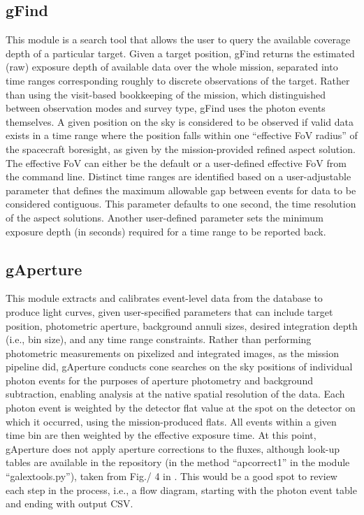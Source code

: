 \documentclass[5p]{elsarticle}
\begin{document}
\subsection{gFind}
This module is a search tool that allows the user to query the available coverage depth of a particular target. Given a target position, gFind returns the estimated (raw) exposure depth of available data over the whole mission, separated into time ranges corresponding roughly to discrete observations of the target. Rather than using the visit-based bookkeeping of the mission, which distinguished between observation modes and survey type, gFind uses the photon events themselves. A given position on the sky is considered to be observed if valid data exists in a time range where the position falls within one ``effective FoV radius'' of the spacecraft boresight, as given by the mission-provided refined aspect solution.  The effective FoV can either be the default or a user-defined effective FoV from the command line.  Distinct time ranges are identified based on a user-adjustable parameter that defines the maximum allowable gap between events for data to be considered contiguous.  This parameter defaults to one second, the time resolution of the aspect solutions. Another user-defined parameter sets the minimum exposure depth (in seconds) required for a time range to be reported back.

\subsection{gAperture}
This module extracts and calibrates event-level data from the database to produce light curves, given user-specified parameters that can include target position, photometric aperture, background annuli sizes, desired integration depth (i.e., bin size), and any time range constraints. Rather than performing photometric measurements on pixelized and integrated images, as the mission pipeline did, gAperture conducts cone searches on the sky positions of individual photon events for the purposes of aperture photometry and background subtraction, enabling analysis at the native spatial resolution of the data. Each photon event is weighted by the detector flat value at the spot on the detector on which it occurred, using the mission-produced flats. All events within a given time bin are then weighted by the effective exposure time.  At this point, gAperture does not apply aperture corrections to the fluxes, although look-up tables are available in the repository (in the method ``apcorrect1'' in the module ``galextools.py''), taken from Fig./ 4 in \citet{mor2007}.  {\color{red}This would be a good spot to review each step in the process, i.e., a flow diagram, starting with the photon event table and ending with output CSV.}
\end{document}
